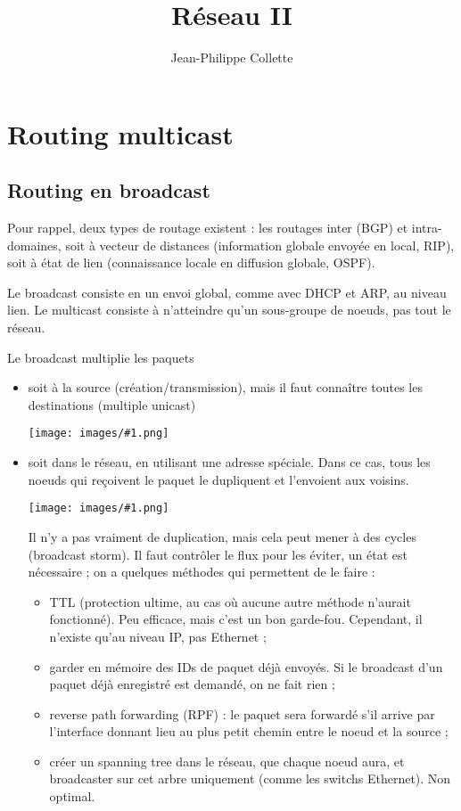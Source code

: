 \documentclass[10pt,a4paper]{report}
\title{Réseau II}
\author{Jean-Philippe Collette}
\newcommand{\dessin}[1]{\begin{center}\texttt{[image: images/\#1.png]}\end{center}}
\begin{document}
	\maketitle
	\tableofcontents
\chapter{Routing multicast}

	\section{Routing en broadcast}
	
	Pour rappel, deux types de routage existent : les routages inter (BGP) et intra-domaines, soit à vecteur de distances (information globale envoyée en local, RIP), soit à état de lien (connaissance locale en diffusion globale, OSPF).
	
	Le broadcast consiste en un envoi global, comme avec DHCP et ARP, au niveau lien. Le multicast consiste à n'atteindre qu'un sous-groupe de noeuds, pas tout le réseau.
	
	Le broadcast multiplie les paquets
	\begin{itemize}
		\item soit à la source (création/transmission), mais il faut connaître toutes les destinations (multiple unicast)
		
		\dessin{1}
				
		\item soit dans le réseau, en utilisant une adresse spéciale. Dans ce cas, tous les noeuds qui reçoivent le paquet le dupliquent et l'envoient aux voisins.
		
		\dessin{2}
		
		Il n'y a pas vraiment de duplication, mais cela peut mener à des cycles (broadcast storm). Il faut contrôler le flux pour les éviter, un état est nécessaire ; on a quelques méthodes qui permettent de le faire :
		
		\begin{itemize}
			\item TTL (protection ultime, au cas où aucune autre méthode n'aurait fonctionné). Peu efficace, mais c'est un bon garde-fou. Cependant, il n'existe qu'au niveau IP, pas Ethernet ;
			\item garder en mémoire des IDs de paquet déjà envoyés. Si le broadcast d'un paquet déjà enregistré est demandé, on ne fait rien ;
			\item reverse path forwarding (RPF) : le paquet sera forwardé s'il arrive par l'interface donnant lieu au plus petit chemin entre le noeud et la source ;
			\item créer un spanning tree dans le réseau, que chaque noeud aura, et broadcaster sur cet arbre uniquement (comme les switchs Ethernet). Non optimal.
		\end{itemize}
	\end{itemize}
	
\end{document}

